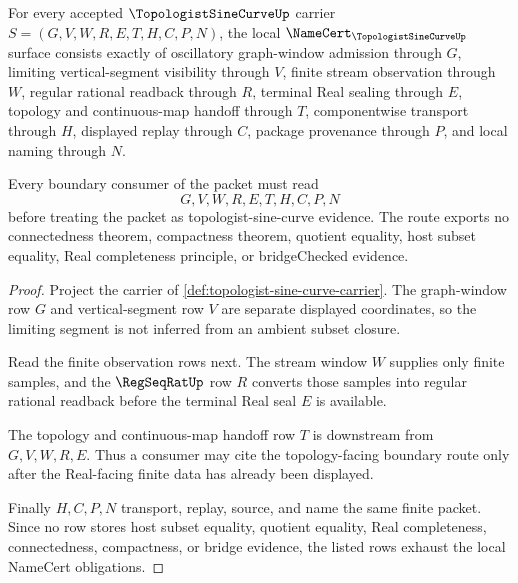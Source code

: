 \begin{theorem}
\label{thm:topologist-sine-curve-namecert-obligations}
For every accepted $\TopologistSineCurveUp$ carrier $S=(G,V,W,R,E,T,H,C,P,N)$, the local $\NameCert_{\TopologistSineCurveUp}$ surface consists exactly of oscillatory graph-window admission through $G$, limiting vertical-segment visibility through $V$, finite stream observation through $W$, regular rational readback through $R$, terminal Real sealing through $E$, topology and continuous-map handoff through $T$, componentwise transport through $H$, displayed replay through $C$, package provenance through $P$, and local naming through $N$.

Every boundary consumer of the packet must read
$$
G,V,W,R,E,T,H,C,P,N
$$
before treating the packet as topologist-sine-curve evidence. The route exports no connectedness theorem, compactness theorem, quotient equality, host subset equality, Real completeness principle, or bridgeChecked evidence.
\end{theorem}
\begin{proof}
Project the carrier of \autoref{def:topologist-sine-curve-carrier}. The graph-window row $G$ and vertical-segment row $V$ are separate displayed coordinates, so the limiting segment is not inferred from an ambient subset closure.

Read the finite observation rows next. The stream window $W$ supplies only finite samples, and the $\RegSeqRatUp$ row $R$ converts those samples into regular rational readback before the terminal Real seal $E$ is available.

The topology and continuous-map handoff row $T$ is downstream from $G,V,W,R,E$. Thus a consumer may cite the topology-facing boundary route only after the Real-facing finite data has already been displayed.

Finally $H,C,P,N$ transport, replay, source, and name the same finite packet. Since no row stores host subset equality, quotient equality, Real completeness, connectedness, compactness, or bridge evidence, the listed rows exhaust the local NameCert obligations.
\end{proof}

